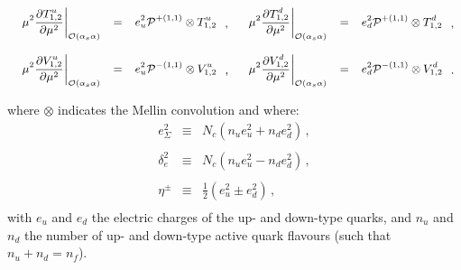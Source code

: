 \begin{widetext}
\begin{equation}
\small
\begin{array}{ll}
\begin{array}{rcl}
\displaystyle \left.\mu^2\frac{\partial T^u_{1,2}}{\partial \mu^2}\right|_{\mathcal{O}(\alpha_s \alpha)} &=&
\displaystyle e_u^2\mathcal{P}^{+(1,1)}\otimes T^u_{1,2}
\end{array}\,, &
\begin{array}{rcl}
\displaystyle \left.\mu^2\frac{\partial T^d_{1,2}}{\partial \mu^2}\right|_{\mathcal{O}(\alpha_s \alpha)} &=&
\displaystyle e_d^2\mathcal{P}^{+(1,1)} \otimes T^d_{1,2}
\end{array}\,,
\\
\\
\begin{array}{rcl}
\displaystyle \left.\mu^2\frac{\partial V^u_{1,2}}{\partial \mu^2}\right|_{\mathcal{O}(\alpha_s \alpha)} &=&
\displaystyle e_u^2\mathcal{P}^{-(1,1)} \otimes V^u_{1,2}
\end{array}\,, &
\begin{array}{rcl}
\displaystyle \left.\mu^2\frac{\partial V^d_{1,2}}{\partial \mu^2}\right|_{\mathcal{O}(\alpha_s \alpha)} &=&
\displaystyle e_d^2\mathcal{P}^{-(1,1)}\otimes V^d_{1,2}
\end{array}\,.
\end{array}
\end{equation}
\end{widetext}
where $\otimes$ indicates the Mellin convolution and where:
\begin{equation}
\begin{array}{rcl}
e_{\Sigma}^{2}& \equiv &\displaystyle
N_c(n_ue_{u}^{2}+n_de_{d}^{2})\,,\\
\\
\delta_e^2 & \equiv &\displaystyle N_c(n_u e_u^2 -n_d e_d^2)\,,\\
\\
\eta^{\pm} & \equiv & \displaystyle \frac{1}{2}\left(e_{u}^{2}\pm
  e_{d}^{2}\right)\,,\\
\end{array}
\end{equation}
with $e_u$ and $e_d$ the electric charges of the up- and down-type
quarks, and $n_u$ and $n_d$ the number of up- and down-type active
quark flavours (such that $n_u+n_d=n_f$).


